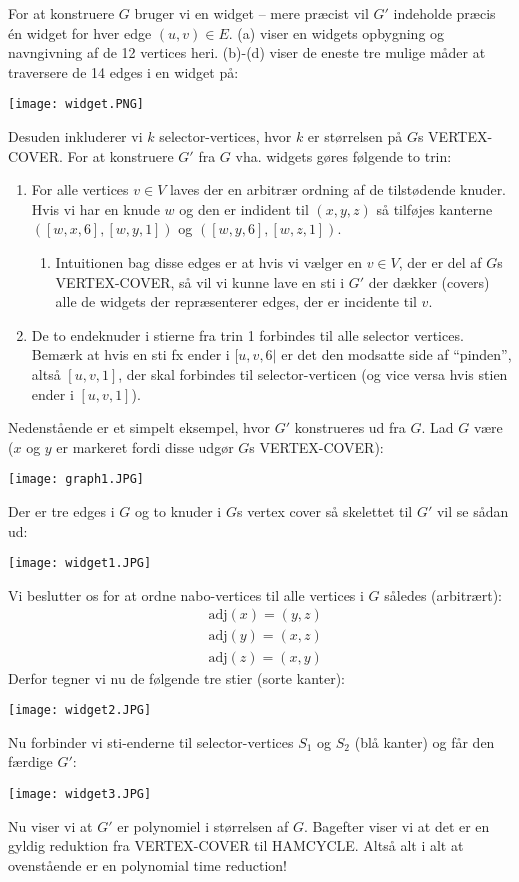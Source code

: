 For at konstruere $G$ bruger vi en widget -- mere præcist vil $G'$ indeholde præcis én widget for hver edge $(u,v) \in E$. (a) viser en widgets opbygning og navngivning af de 12 vertices heri. (b)-(d) viser de eneste tre mulige måder at traversere de 14 edges i en widget på:
\begin{center}
	\texttt{[image: widget.PNG]}
\end{center}
Desuden inkluderer vi $k$ selector-vertices, hvor $k$ er størrelsen på $G$s VERTEX-COVER. For at konstruere $G'$ fra $G$ vha. widgets gøres følgende to trin:
\begin{enumerate}
	\item For alle vertices $v \in V$ laves der en arbitrær ordning af de tilstødende knuder. Hvis vi har en knude $w$ og den er indident til $(x,y,z)$ så tilføjes kanterne $([w,x,6],[w,y,1])$ og $([w,y,6],[w,z,1])$.
	\begin{enumerate}
		\item Intuitionen bag disse edges er at hvis vi vælger en $v \in V$, der er del af $G$s VERTEX-COVER, så vil vi kunne lave en sti i $G'$ der dækker (covers) alle de widgets der repræsenterer edges, der er incidente til $v$.
	\end{enumerate} 
	\item De to endeknuder i stierne fra trin 1 forbindes til alle selector vertices. Bemærk at hvis en sti fx ender i $[u,v,6|$ er det den modsatte side af ``pinden'', altså $[u,v,1]$, der skal forbindes til selector-verticen (og vice versa hvis stien ender i $[u,v,1]$).  
\end{enumerate}
Nedenstående er et simpelt eksempel, hvor $G'$ konstrueres ud fra $G$. Lad $G$ være ($x$ og $y$ er markeret fordi disse udgør $G$s VERTEX-COVER): 
\begin{center}
	\texttt{[image: graph1.JPG]}
\end{center}
Der er tre edges i $G$ og to knuder i $G$s vertex cover så skelettet til $G'$ vil se sådan ud: 
\begin{center}
	\texttt{[image: widget1.JPG]}
\end{center}
Vi beslutter os for at ordne nabo-vertices til alle vertices i $G$ således (arbitrært):
\begin{align*}
&\text{adj}(x)=(y,z) \\	
&\text{adj}(y)=(x,z) \\
&\text{adj}(z)=(x,y)
\end{align*}
Derfor tegner vi nu de følgende tre stier (sorte kanter): 
\begin{center}
	\texttt{[image: widget2.JPG]}
\end{center}
Nu forbinder vi sti-enderne til selector-vertices $S_1$ og $S_2$ (blå kanter) og får den færdige $G'$: 
\begin{center}
	\texttt{[image: widget3.JPG]}
\end{center}
Nu viser vi at $G'$ er polynomiel i størrelsen af $G$. Bagefter viser vi at det er en gyldig reduktion fra VERTEX-COVER til HAMCYCLE. Altså alt i alt at ovenstående er en polynomial time reduction! \\

